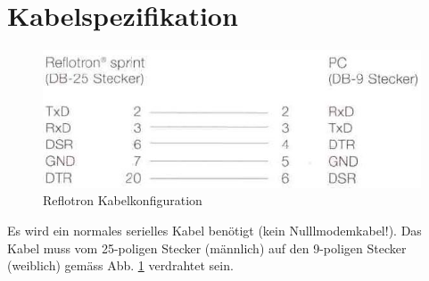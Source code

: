 \documentclass[a4paper]{scrartcl}
\begin{document}
\section{Kabelspezifikation}
\begin{figure}[h]
    \includegraphics{kabel}
    \caption{Reflotron Kabelkonfiguration}
    \label{fig:kabel}
\end{figure}
Es wird ein normales serielles Kabel ben\"otigt (kein Nulllmodemkabel!). Das Kabel muss vom 25-poligen Stecker (m\"annlich) auf den 9-poligen Stecker (weiblich) gem\"ass Abb. \ref{fig:kabel} verdrahtet sein.
\end{document}
